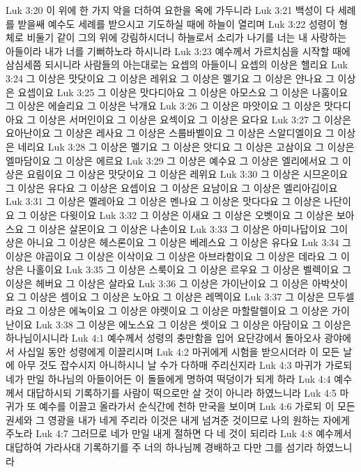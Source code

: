 Luk 3:20  이 위에 한 가지 악을 더하여 요한을 옥에 가두니라
Luk 3:21  백성이 다 세례를 받을쌔 예수도 세례를 받으시고 기도하실 때에 하늘이 열리며
Luk 3:22  성령이 형체로 비둘기 같이 그의 위에 강림하시더니 하늘로서 소리가 나기를 너는 내 사랑하는 아들이라 내가 너를 기뻐하노라 하시니라
Luk 3:23  예수께서 가르치심을 시작할 때에 삼심세쯤 되시니라 사람들의 아는대로는 요셉의 아들이니 요셉의 이상은 헬리요
Luk 3:24  그 이상은 맛닷이요 그 이상은 레위요 그 이상은 멜기요 그 이상은 얀나요 그 이상은 요셉이요
Luk 3:25  그 이상은 맛다디아요 그 이상은 아모스요 그 이상은 나훔이요 그 이상은 에슬리요 그 이상은 낙개요
Luk 3:26  그 이상은 마앗이요 그 이상은 맛다디아요 그 이상은 서머인이요 그 이상은 요섹이요 그 이상은 요다요
Luk 3:27  그 이상은 요아난이요 그 이상은 레사요 그 이상은 스룹바벨이요 그 이상은 스알디엘이요 그 이상은 네리요
Luk 3:28  그 이상은 멜기요 그 이상은 앗디요 그 이상은 고삼이요 그 이상은 엘마담이요 그 이상은 에르요
Luk 3:29  그 이상은 예수요 그 이상은 엘리에서요 그 이상은 요림이요 그 이상은 맛닷이요 그 이상은 레위요
Luk 3:30  그 이상은 시므온이요 그 이상은 유다요 그 이상은 요셉이요 그 이상은 요남이요 그 이상은 엘리아김이요
Luk 3:31  그 이상은 멜레아요 그 이상은 멘나요 그 이상은 맛다다요 그 이상은 나단이요 그 이상은 다윗이요
Luk 3:32  그 이상은 이새요 그 이상은 오벳이요 그 이상은 보아스요 그 이상은 살몬이요 그 이상은 나손이요
Luk 3:33  그 이상은 아미나답이요 그이상은 아니요 그 이상은 헤스론이요 그 이상은 베레스요 그 이상은 유다요
Luk 3:34  그 이상은 야곱이요 그 이상은 이삭이요 그 이상은 아브라함이요 그 이상은 데라요 그 이상은 나홀이요
Luk 3:35  그 이상은 스룩이요 그 이상은 르우요 그 이상은 벨렉이요 그 이상은 헤버요 그 이상은 살라요
Luk 3:36  그 이상은 가이난이요 그 이상은 아박삿이요 그 이상은 셈이요 그 이상은 노아요 그 이상은 레멕이요
Luk 3:37  그 이상은 므두셀라요 그 이상은 에녹이요 그 이상은 야렛이요 그 이상은 마할랄렐이요 그 이상은 가이난이요
Luk 3:38  그 이상은 에노스요 그 이상은 셋이요 그 이상은 아담이요 그 이상은 하나님이시니라
Luk 4:1  예수께서 성령의 충만함을 입어 요단강에서 돌아오사 광야에서 사십일 동안 성령에게 이끌리시며
Luk 4:2  마귀에게 시험을 받으시더라 이 모든 날에 아무 것도 잡수시지 아니하시니 날 수가 다하매 주리신지라
Luk 4:3  마귀가 가로되 네가 만일 하나님의 아들이어든 이 돌들에게 명하여 떡덩이가 되게 하라
Luk 4:4  예수께서 대답하시되 기록하기를 사람이 떡으로만 살 것이 아니라 하였느니라
Luk 4:5  마귀가 또 예수를 이끌고 올라가서 순식간에 천하 만국을 보이며
Luk 4:6  가로되 이 모든 권세와 그 영광을 내가 네게 주리라 이것은 내게 넘겨준 것이므로 나의 원하는 자에게 주노라
Luk 4:7  그러므로 네가 만일 내게 절하면 다 네 것이 되리라
Luk 4:8  예수께서 대답하여 가라사대 기록하기를 주 너의 하나님께 경배하고 다만 그를 섬기라 하였느니라
